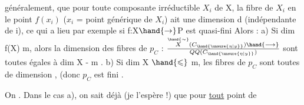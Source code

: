 généralement, que  pour toute composante irréductible $X_i$ de X, la fibre
de $X_i$ en le point $f(x_i)$  ($x_i$ = point générique de $X_i$) ait une dimension d
(indépendante de i), ce qui a lieu par exemple  si f:X$\hand{\to}$P est quasi-fini\hand{,} 
Alors :     a)  Si  dim f(X) \hand{$>$} m, alors la dimension  des fibres de
$p_C$  : $\overset{\hand{\sim}}{X}(C_{\hand{\unsure{\eta|y}}}) \hand{\longrightarrow} \over{Q}{Q}(C_{\hand{\unsure{\eta|y}}})$  sont toutes égales à  dim X - m .   b)  Si dim X
$\hand{\leqslant}$ m,  les fibres  de $p_C$  sont toutes de dimension ,  (donc $p_C$ est fini   \hand{]}.

On 
. Dans le cas a), 
 on sait déjà (je l'espère !) que pour \uline{tout}  point  de

